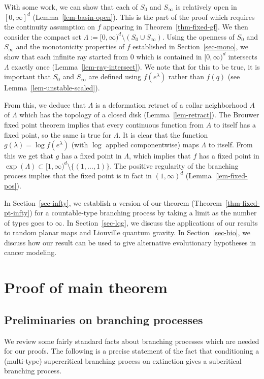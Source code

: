 \documentclass[11pt]{article}
\theoremstyle{plain}
\theoremstyle{definition}
\numberwithin{equation}{section}
\begin{document}
With some work, we can show that each of $S_0$ and $S_\infty$ is relatively open in $[0,\infty]^d$ (Lemma~\ref{lem-basin-open}). This is the part of the proof which requires the continuity assumption on $f$ appearing in Theorem~\ref{thm-fixed-gf}. We then consider the compact set $\Lambda := [0,\infty)^d\setminus (S_0\cup S_\infty)$.
Using the openness of $S_0$ and $S_\infty$ and the monotonicity properties of $f$ established in Section~\ref{sec-mono}, we show that each infinite ray started from 0 which is contained in $[0,\infty)^d$ intersects $\Lambda$ exactly once (Lemma~\ref{lem-ray-intersect}). We note that for this to be true, it is important that $S_0$ and $S_\infty$ are defined using $f(e^\lambda)$ rather than $f(q)$ (see Lemma~\ref{lem-unstable-scaled}). 

 From this, we deduce that $\Lambda$ is a deformation retract of a collar neighborhood $A$ of $\Lambda$ which has the topology of a closed disk (Lemma~\ref{lem-retract}). The Brouwer fixed point theorem implies that every continuous function from $A$ to itself has a fixed point, so the same is true for $\Lambda$. It is clear that the function $g(\lambda) = \log f(e^\lambda)$ (with $\log$ applied componentwise) maps $\Lambda$ to itself. From this we get that $g$ has a fixed point in $\Lambda$, which implies that $f$ has a fixed point in $\exp(\Lambda)\subset [1,\infty)^d \setminus \{(1,\dots,1)\}$. The positive regularity of the branching process implies that the fixed point is in fact in $(1,\infty)^d$ (Lemma~\ref{lem-fixed-pos}).
 
In Section~\ref{sec-infty}, we establish a version of our theorem (Theorem~\ref{thm-fixed-pt-infty}) for a countable-type branching process by taking a limit as the number of types goes to $\infty$. In Section~\ref{sec-lqg}, we discuss the applications of our results to random planar maps and Liouville quantum gravity. In Section~\ref{sec-bio}, we discuss how our result can be used to give alternative evolutionary hypotheses in cancer modeling. 
 

\section{Proof of main theorem}
\label{sec-proof}


\subsection{Preliminaries on branching processes}
\label{sec-prelim}
We review some fairly standard facts about branching processes which are needed for our proofs. 
The following is a precise statement of the fact that conditioning a (multi-type) supercritical branching process on extinction gives a subcritical branching process. 
\end{document}
